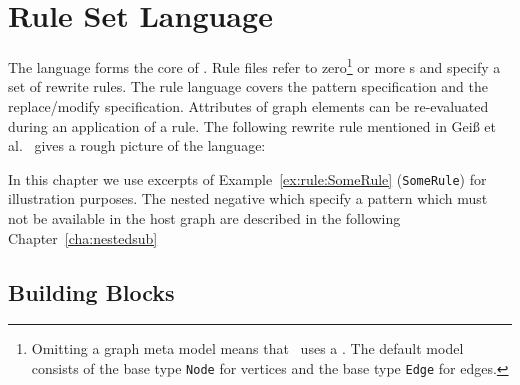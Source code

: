 \chapter{Rule Set Language}
\label{chaprulelang}

The  language forms the core of \GrG. Rule files refer to zero\footnote{Omitting a graph meta model means that \GrG\ uses a . The default model consists of the base type \texttt{Node} for vertices and the base type \texttt{Edge} for edges.} or more s and specify a set of rewrite rules. The rule language covers the pattern specification and the replace/modify specification. Attributes of graph elements can be re-evaluated during an application of a rule. The following rewrite rule mentioned in Geiß et al.~\cite{GBGHS:06} gives a rough picture of the language:
\begin{example}\label{ex:rule:SomeRule}
\end{example}
In this chapter we use excerpts of Example~\ref{ex:rule:SomeRule} (\texttt{SomeRule}) for illustration purposes.
The nested negative which specify a pattern which must not be available in the host graph are described in the following Chapter~\ref{cha:nestedsub}

\section{Building Blocks}
\label{rulebb}

